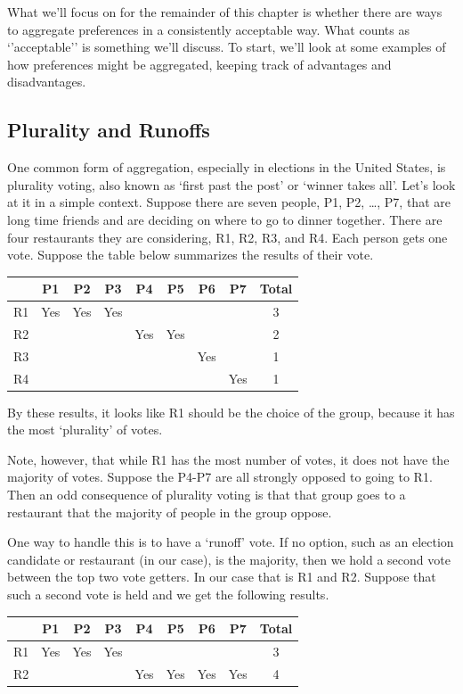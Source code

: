 \documentclass[]{tufte-book}
\begin{document}
What we'll focus on for the remainder of this chapter is whether there are ways to aggregate preferences in a consistently acceptable way. What counts as `'acceptable'' is something we'll discuss. To start, we'll look at some examples of how preferences might be aggregated, keeping track of advantages and disadvantages.

\hypertarget{plurality-and-runoffs}{%
\subsection{Plurality and Runoffs}\label{plurality-and-runoffs}}

One common form of aggregation, especially in elections in the United States, is plurality voting, also known as `first past the post' or `winner takes all'. Let's look at it in a simple context. Suppose there are seven people, P1, P2, \ldots{}, P7, that are long time friends and are deciding on where to go to dinner together. There are four restaurants they are considering, R1, R2, R3, and R4. Each person gets one vote. Suppose the table below summarizes the results of their vote.

\begin{longtable}[]{@{}lcccccccc@{}}
\toprule
& P1 & P2 & P3 & P4 & P5 & P6 & P7 & Total\tabularnewline
\midrule
\endhead
R1 & Yes & Yes & Yes & & & & & 3\tabularnewline
R2 & & & & Yes & Yes & & & 2\tabularnewline
R3 & & & & & & Yes & & 1\tabularnewline
R4 & & & & & & & Yes & 1\tabularnewline
\bottomrule
\end{longtable}

By these results, it looks like R1 should be the choice of the group, because it has the most `plurality' of votes.

Note, however, that while R1 has the most number of votes, it does not have the majority of votes. Suppose the P4-P7 are all strongly opposed to going to R1. Then an odd consequence of plurality voting is that that group goes to a restaurant that the majority of people in the group oppose.

One way to handle this is to have a `runoff' vote. If no option, such as an election candidate or restaurant (in our case), is the majority, then we hold a second vote between the top two vote getters. In our case that is R1 and R2. Suppose that such a second vote is held and we get the following results.

\begin{longtable}[]{@{}lcccccccc@{}}
\toprule
& P1 & P2 & P3 & P4 & P5 & P6 & P7 & Total\tabularnewline
\midrule
\endhead
R1 & Yes & Yes & Yes & & & & & 3\tabularnewline
R2 & & & & Yes & Yes & Yes & Yes & 4\tabularnewline
\bottomrule
\end{longtable}
\end{document}
